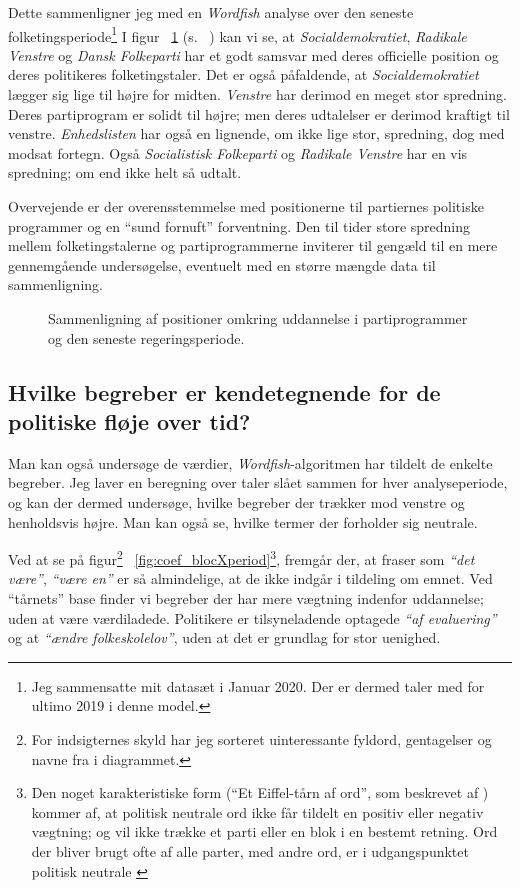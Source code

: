 Dette sammenligner jeg med en \textit{Wordfish} analyse over den seneste folketingsperiode\footnote{Jeg sammensatte mit datasæt i Januar 2020. Der er dermed taler med for ultimo 2019 i denne model.}
I figur ~\ref{fig:fish_comp} (s. ~\pageref{fig:fish_comp}) kan vi se, at \textit{Socialdemokratiet}, \textit{Radikale Venstre} og \textit{Dansk Folkeparti} har et godt samsvar med deres officielle position og deres politikeres folketingstaler.
Det er også påfaldende, at \textit{Socialdemokratiet} lægger sig lige til højre for midten.
\textit{Venstre} har derimod en meget stor spredning.
Deres partiprogram er solidt til højre; men deres udtalelser er derimod 
kraftigt til venstre.
\textit{Enhedslisten} har også en lignende, om ikke lige stor, spredning, dog med modsat fortegn.
Også \textit{Socialistisk Folkeparti} og \textit{Radikale Venstre} har en vis spredning; om end ikke helt så udtalt.

Overvejende er der overensstemmelse med positionerne til partiernes politiske programmer og en “sund fornuft” forventning.
Den til tider store spredning mellem folketingstalerne og partiprogrammerne inviterer til gengæld til en mere gennemgående undersøgelse, eventuelt med en større mængde data til sammenligning.

\begin{figure}
  
 \caption{Sammenligning af positioner omkring uddannelse i partiprogrammer og den seneste regeringsperiode.}
\label{fig:fish_comp}
\end{figure}

\subsection{Hvilke begreber er kendetegnende for de politiske fløje over tid?}

Man kan også undersøge de værdier, \textit{Wordfish}-algoritmen har tildelt de enkelte begreber.
Jeg laver en beregning over taler slået sammen for hver analyseperiode, og kan der dermed undersøge, hvilke begreber der trækker mod venstre og henholdsvis højre.
Man kan også se, hvilke termer der forholder sig neutrale.

Ved at se på figur\footnote{For indsigternes skyld har jeg sorteret uinteressante fyldord, gentagelser og navne fra i diagrammet.} ~\ref{fig:coef_blocXperiod}\footnote{Den noget karakteristiske form (“Et Eiffel-tårn af ord”, som beskrevet af \citeauthor{slapinScalingModelEstimating2008}) kommer af, at politisk neutrale ord ikke får tildelt en positiv eller negativ vægtning; og vil ikke trække et parti eller en blok i en bestemt retning.
Ord der bliver brugt ofte af alle parter, med andre ord, er i udgangspunktet politisk neutrale \autocite[s. 709]{slapinScalingModelEstimating2008}},
fremgår der, at fraser som \textit{“det være”}, \textit{“være en”} er så almindelige, at de ikke indgår i tildeling om emnet.
Ved “tårnets” base finder vi begreber der har mere vægtning indenfor uddannelse; uden at være værdiladede.
Politikere er tilsyneladende optagede \textit{“af evaluering”} og at \textit{“ændre folkeskolelov”}, uden at det er grundlag for stor uenighed.

